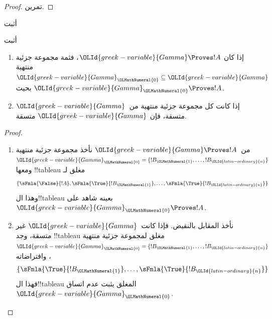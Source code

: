 \documentclass[../../../include/open-logic-section]{subfiles}
\begin{document}
\begin{proof}
تمرين.
\end{proof}

\begin{prob}
أثبت 
\end{prob}
\tagendprob

\begin{prob}
أثبت 
\end{prob}
\tagendprob

\begin{prop}[التراص]
  \begin{enumerate}
  \item إذا كان $\OLId{greek-variable}{Gamma} \Proves !A$، فثمة مجموعة جزئية منتهية $\OLId{greek-variable}{Gamma}_\OLMathNumeral{0}
    \subseteq \OLId{greek-variable}{Gamma}$ بحيث $\OLId{greek-variable}{Gamma}_\OLMathNumeral{0} \Proves !A$.
  \item إذا كانت كل مجموعة جزئية منتهية من~$\OLId{greek-variable}{Gamma}$ متسقة، فإن $\OLId{greek-variable}{Gamma}$
    متسقة.
  \end{enumerate}
\end{prop}

\begin{proof}
  \begin{enumerate}
    \item من~$\OLId{greek-variable}{Gamma} \Proves !A$ نأخذ مجموعة جزئية منتهية
      $\OLId{greek-variable}{Gamma}_\OLMathNumeral{0} = \{!B_\OLMathNumeral{1}, \dots, !B_\OLId{latin-ordinary}{n}\}$ ومعها !!{tableau} مغلق لـ
      \[
      \{\sFmla{\False}{!A}, \sFmla{\True}{!B_\OLMathNumeral{1}}, \dots, \sFmla{\True}{!B_\OLId{latin-ordinary}{n}}\}
      \]
      وهذا ال!!{tableau} بعينه شاهد على~$\OLId{greek-variable}{Gamma}_\OLMathNumeral{0} \Proves !A$.
    \item نأخذ المقابل بالنقيض. فإذا كانت~$\OLId{greek-variable}{Gamma}$ غير متسقة،
      وجد !!{tableau} مغلق لمجموعة جزئية منتهية
      $\OLId{greek-variable}{Gamma}_\OLMathNumeral{0} = \{!B_\OLMathNumeral{1}, \dots, !B_\OLId{latin-ordinary}{n}\}$، وافتراضاته
      \[
      \{\sFmla{\True}{!B_\OLMathNumeral{1}}, \dots, \sFmla{\True}{!B_\OLId{latin-ordinary}{n}}\}
      \]
      فهذا ال!!{tableau} المغلق يثبت عدم اتساق~$\OLId{greek-variable}{Gamma}_\OLMathNumeral{0}$.
  \end{enumerate}
\end{proof}
\end{document}
